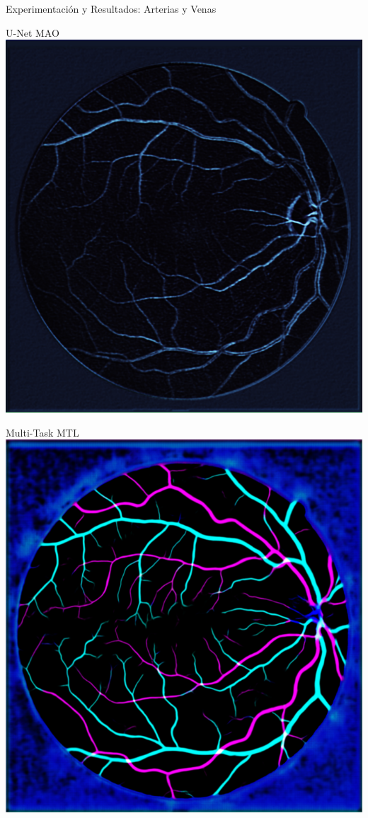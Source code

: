 \documentclass[xcolor=dvipsnames,table]{beamer}
\begin{document}
\begin{frame}{Experimentación y Resultados: Arterias y Venas}
\begin{minipage}[b]{0.13\textwidth}
	\end{minipage}\hfill
	\begin{minipage}[b]{0.13\textwidth}
		\centering
		U-Net MAO\\[0.2cm]
		\includegraphics[width=\linewidth]{my_images/video/AVUNETMAO.png}
	\end{minipage}\hfill
	\begin{minipage}[b]{0.13\textwidth}
		\centering
		Multi-Task MTL\\[0.2cm]
		\includegraphics[width=\linewidth]{my_images/video/AVTASKMTL.png}

\end{minipage}
\end{frame}
\end{document}
